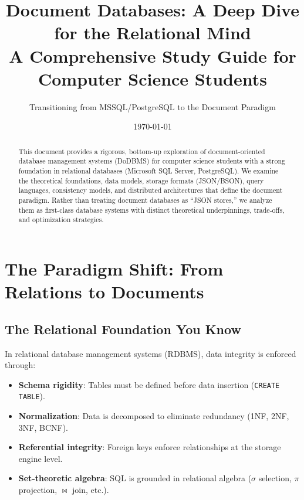 \documentclass[12pt,a4paper]{article}
\title{\textbf{Document Databases: A Deep Dive for the Relational Mind}\\\large A Comprehensive Study Guide for Computer Science Students}
\author{Transitioning from MSSQL/PostgreSQL to the Document Paradigm}
\date{\today}
\begin{document}
\maketitle

\begin{abstract}
This document provides a rigorous, bottom-up exploration of document-oriented database management systems (DoDBMS) for computer science students with a strong foundation in relational databases (Microsoft SQL Server, PostgreSQL). We examine the theoretical foundations, data models, storage formats (JSON/BSON), query languages, consistency models, and distributed architectures that define the document paradigm. Rather than treating document databases as ``JSON stores,'' we analyze them as first-class database systems with distinct theoretical underpinnings, trade-offs, and optimization strategies.
\end{abstract}

\tableofcontents
\newpage

\section{The Paradigm Shift: From Relations to Documents}

\subsection{The Relational Foundation You Know}

In relational database management systems (RDBMS), data integrity is enforced through:

\begin{itemize}[noitemsep]
    \item \textbf{Schema rigidity}: Tables must be defined before data insertion (\texttt{CREATE TABLE}).
    \item \textbf{Normalization}: Data is decomposed to eliminate redundancy (1NF, 2NF, 3NF, BCNF).
    \item \textbf{Referential integrity}: Foreign keys enforce relationships at the storage engine level.
    \item \textbf{Set-theoretic algebra}: SQL is grounded in relational algebra ($\sigma$ selection, $\pi$ projection, $\bowtie$ join, etc.).
\end{itemize}
\end{document}
